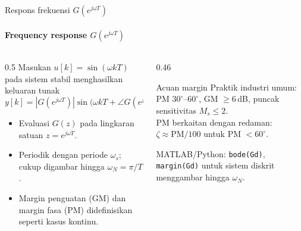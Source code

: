 \documentclass[aspectratio=169,10pt]{beamer}
\begin{document}
\begin{frame}{Respons frekuensi $G(e^{j\omega T})$}
	\framesubtitle{Frequency response $G(e^{j\omega T})$}
	\begin{columns}[T]
		\begin{column}{0.5\textwidth}
			\small
			Masukan $u[k] = \sin(\omega kT)$ pada sistem stabil menghasilkan keluaran tunak
			\[
				y[k] = |G(e^{j\omega T})|\sin\big(\omega kT + \angle G(e^{j\omega T})\big)
			\]
			\begin{itemize}
				\item Evaluasi $G(z)$ pada lingkaran satuan $z = e^{j\omega T}$.
				\item Periodik dengan periode $\omega_s$; cukup digambar hingga $\omega_N = \pi/T$.
				\item Margin penguatan (GM) dan margin fasa (PM) didefinisikan seperti kasus kontinu.
			\end{itemize}
		\end{column}
		\begin{column}{0.46\textwidth}
			\begin{block}{Acuan margin}
				\small
				Praktik industri umum: PM $30^\circ$--$60^\circ$, GM $\ge 6$\,dB, puncak sensitivitas $M_s \le 2$.\\[3pt]
				PM berkaitan dengan redaman: $\zeta \approx \text{PM}/100$ untuk PM $< 60^\circ$.
			\end{block}
			{\scriptsize MATLAB/Python: \texttt{bode(Gd)}, \texttt{margin(Gd)} untuk sistem diskrit menggambar hingga $\omega_N$.}
		\end{column}
	\end{columns}
\end{frame}
\end{document}
